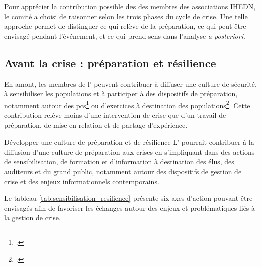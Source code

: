Pour apprécier la contribution possible des des membres des associations IHEDN, le comité a choisi de raisonner selon les trois phases du cycle de crise. Une telle approche permet de distinguer ce qui relève de la préparation, ce qui peut être envisagé pendant l'événement, et ce qui prend sens dans l'analyse \textit{a posteriori}.

\subsection{Avant la crise : préparation et résilience}

En amont, les membres de l'\ARSeize{} peuvent contribuer à diffuser une culture de sécurité, à sensibiliser les populations et à participer à des dispositifs de préparation, notamment autour des \gls{pcs}\footcite{PCS_PICS_def} ou d'exercices à destination des populations\footcite{Gestion_de_crise_def_exemples}. Cette contribution relève moins d'une intervention de crise que d'un travail de préparation, de mise en relation et de partage d'expérience.


\begin{proposition}{Développer une culture de préparation et de résilience}
L'\ARSeize{} pourrait contribuer à la diffusion d'une culture de préparation aux crises en s'impliquant dans des actions de sensibilisation, de formation et d'information à destination des élus, des auditeurs et du grand public, notamment autour des dispositifs de gestion de crise et des enjeux informationnels contemporains.
\end{proposition}

Le tableau \ref{tab:sensibilisation_resilience} présente six axes d'action pouvant être envisagés afin de favoriser les échanges autour des enjeux et problématiques liés à la gestion de crise.

